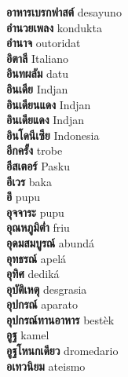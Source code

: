 \textbf{ อาหารเบรกฟาสต์  } desayuno \\
\textbf{ อำนวยเพลง  } kondukta \\
\textbf{ อำนาจ  } outoridat \\
\textbf{ อิตาลี  } Italiano \\
\textbf{ อินทผลัม  } datu \\
\textbf{ อินเดีย  } Indjan \\
\textbf{ อินเดียนแดง  } Indjan \\
\textbf{ อินเดียแดง  } Indjan \\
\textbf{ อินโดนีเซีย  } Indonesia \\
\textbf{ อีกครั้ง  } trobe \\
\textbf{ อีสเตอร์  } Pasku \\
\textbf{ อีเวร  } baka \\
\textbf{ อึ  } pupu \\
\textbf{ อุจจาระ  } pupu \\
\textbf{ อุณหภูมิต่ำ  } friu \\
\textbf{ อุดมสมบูรณ์  } abundá \\
\textbf{ อุทธรณ์  } apelá \\
\textbf{ อุทิศ  } dediká \\
\textbf{ อุบัติเหตุ  } desgrasia \\
\textbf{ อุปกรณ์  } aparato \\
\textbf{ อุปกรณ์ทานอาหาร  } bestèk \\
\textbf{ อูฐ  } kamel \\
\textbf{ อูฐโหนกเดียว  } dromedario \\
\textbf{ อเทวนิยม  } ateismo \\
